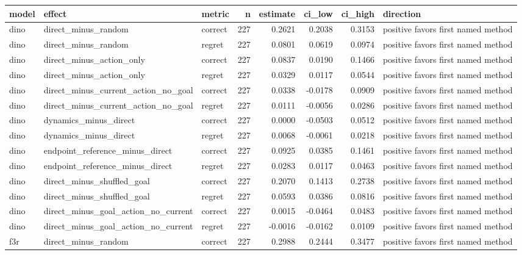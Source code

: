 \begin{tabular}{lllrrrrl}
\toprule
model & effect & metric & n & estimate & ci\_low & ci\_high & direction \\
\midrule
dino & direct\_minus\_random & correct & 227 & 0.2621 & 0.2038 & 0.3153 & positive favors first named method \\
dino & direct\_minus\_random & regret & 227 & 0.0801 & 0.0619 & 0.0974 & positive favors first named method \\
dino & direct\_minus\_action\_only & correct & 227 & 0.0837 & 0.0190 & 0.1466 & positive favors first named method \\
dino & direct\_minus\_action\_only & regret & 227 & 0.0329 & 0.0117 & 0.0544 & positive favors first named method \\
dino & direct\_minus\_current\_action\_no\_goal & correct & 227 & 0.0338 & -0.0178 & 0.0909 & positive favors first named method \\
dino & direct\_minus\_current\_action\_no\_goal & regret & 227 & 0.0111 & -0.0056 & 0.0286 & positive favors first named method \\
dino & dynamics\_minus\_direct & correct & 227 & 0.0000 & -0.0503 & 0.0512 & positive favors first named method \\
dino & dynamics\_minus\_direct & regret & 227 & 0.0068 & -0.0061 & 0.0218 & positive favors first named method \\
dino & endpoint\_reference\_minus\_direct & correct & 227 & 0.0925 & 0.0385 & 0.1461 & positive favors first named method \\
dino & endpoint\_reference\_minus\_direct & regret & 227 & 0.0283 & 0.0117 & 0.0463 & positive favors first named method \\
dino & direct\_minus\_shuffled\_goal & correct & 227 & 0.2070 & 0.1413 & 0.2738 & positive favors first named method \\
dino & direct\_minus\_shuffled\_goal & regret & 227 & 0.0593 & 0.0386 & 0.0816 & positive favors first named method \\
dino & direct\_minus\_goal\_action\_no\_current & correct & 227 & 0.0015 & -0.0464 & 0.0483 & positive favors first named method \\
dino & direct\_minus\_goal\_action\_no\_current & regret & 227 & -0.0016 & -0.0162 & 0.0109 & positive favors first named method \\
f3r & direct\_minus\_random & correct & 227 & 0.2988 & 0.2444 & 0.3477 & positive favors first named method \\

\end{tabular}

